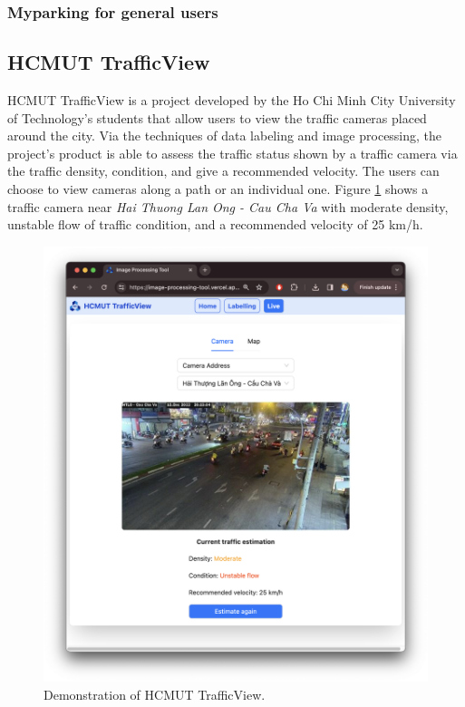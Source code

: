 \subsubsection{Myparking for general users}

\subsection{HCMUT TrafficView}
HCMUT TrafficView is a project developed by the Ho Chi Minh City University of Technology's students that allow users to view the traffic cameras placed around the city. Via the techniques of data labeling and image processing, the project's product is able to assess the traffic status shown by a traffic camera via the traffic density, condition, and give a recommended velocity. The users can choose to view cameras along a path or an individual one. \cite{hcmut_trafficview} Figure \ref{fig:trafficview_demo} shows a traffic camera near \textit{Hai Thuong Lan Ong - Cau Cha Va} with moderate density, unstable flow of traffic condition, and a recommended velocity of 25 km/h.

\begin{figure}[H]
    \centering
    \includegraphics[width=\textwidth]{assets/images/Research/trafficview/hcmut_trafficview_demo.png}
    \caption{Demonstration of HCMUT TrafficView.}
    \label{fig:trafficview_demo}
\end{figure}

